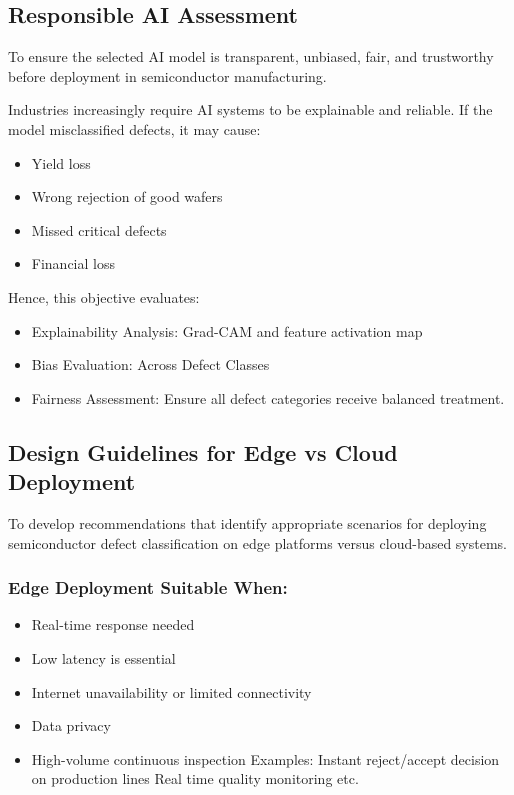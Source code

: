 \subsection {Responsible AI Assessment}

To ensure the selected AI model is transparent, unbiased, fair, and trustworthy before deployment in semiconductor manufacturing.

Industries increasingly require AI systems to be explainable and reliable. If the model misclassified defects, it may cause:
\begin{itemize}
\item Yield loss
\item Wrong rejection of good wafers
\item Missed critical defects
\item Financial loss
\end{itemize}
Hence, this objective evaluates:
\begin{itemize}
\item  Explainability Analysis: Grad-CAM and feature activation map
\item  Bias Evaluation: Across Defect Classes
\item  Fairness Assessment: Ensure all defect categories receive balanced treatment.
\end{itemize}

\subsection  {Design Guidelines for Edge vs Cloud Deployment}

To develop recommendations that identify appropriate scenarios for deploying semiconductor defect classification on edge platforms versus cloud-based systems.


\subsubsection{Edge Deployment Suitable When:}
\begin{itemize}
\item Real-time response needed
\item Low latency is essential
\item Internet unavailability or limited connectivity
\item Data privacy 
\item High-volume continuous inspection \newline
Examples:\newline
Instant reject/accept decision on production lines\newline
Real time quality monitoring etc. \newline
\end{itemize} 
